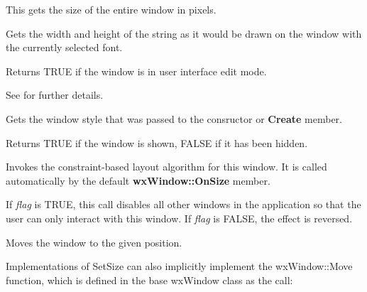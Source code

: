 
This gets the size of the entire window in pixels.



Gets the width and height of the string as it would be drawn on the
window with the currently selected font.

\label{getusereditmode}


Returns TRUE if the window is in user interface edit mode.

See  for
further details.



Gets the window style that was passed to the consructor or {\bf Create}
member.



Returns TRUE if the window is shown, FALSE if it has been hidden.

\label{wxwindowlayout}


Invokes the constraint-based layout algorithm for this window. It is called
automatically by the default {\bf wxWindow::OnSize} member.



If {\it flag} is TRUE, this call disables all other windows in the application so that
the user can only interact with this window. If {\it flag} is FALSE, the effect is reversed.



Moves the window to the given position.

Implementations of SetSize can also implicitly implement the
wxWindow::Move function, which is defined in the base wxWindow class
as the call:

